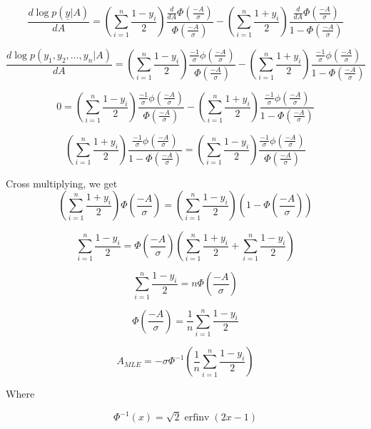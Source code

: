 \documentclass{amsart}
\DeclareMathOperator\erfinv{erfinv}
\begin{document}
\begin{equation}
\frac{d\log p(\underline{y} | A)}{dA} = \left( \sum_{i=1}^{n}\frac{1-y_i}{2} \right)  \frac{\frac{d}{dA} \Phi(\frac{-A}{\sigma})}{\Phi(\frac{-A}{\sigma})} - \left( \sum_{i=1}^{n}\frac{1+y_i}{2} \right)  \frac{\frac{d}{dA} \Phi(\frac{-A}{\sigma})}{1-\Phi(\frac{-A}{\sigma})}
\end{equation}

\begin{equation}
\frac{d\log p(y_1, y_2, ..., y_n | A)}{dA} = \left( \sum_{i=1}^{n}\frac{1-y_i}{2} \right)  \frac{\frac{-1}{\sigma} \phi(\frac{-A}{\sigma})}{\Phi(\frac{-A}{\sigma})} - \left( \sum_{i=1}^{n}\frac{1+y_i}{2} \right)  \frac{\frac{-1}{\sigma} \phi(\frac{-A}{\sigma})}{1-\Phi(\frac{-A}{\sigma})}
\end{equation}

\begin{equation}
0 = \left( \sum_{i=1}^{n}\frac{1-y_i}{2} \right)  \frac{\frac{-1}{\sigma} \phi(\frac{-A}{\sigma})}{\Phi(\frac{-A}{\sigma})} - \left( \sum_{i=1}^{n}\frac{1+y_i}{2} \right)  \frac{\frac{-1}{\sigma} \phi(\frac{-A}{\sigma})}{1-\Phi(\frac{-A}{\sigma})}
\end{equation}

\begin{equation}
\left( \sum_{i=1}^{n}\frac{1+y_i}{2} \right)  \frac{\frac{-1}{\sigma} \phi(\frac{-A}{\sigma})}{1-\Phi(\frac{-A}{\sigma})} = 
\left( \sum_{i=1}^{n}\frac{1-y_i}{2} \right)  \frac{\frac{-1}{\sigma} \phi(\frac{-A}{\sigma})}{\Phi(\frac{-A}{\sigma})} 
\end{equation}

Cross multiplying, we get
\begin{equation}
\left(\sum_{i=1}^{n}\frac{1+y_i}{2}\right)\Phi(\frac{-A}{\sigma}) = \left(\sum_{i=1}^{n}\frac{1-y_i}{2}\right)\left(1-\Phi(\frac{-A}{\sigma})\right)
\end{equation}

\begin{equation}
\sum_{i=1}^{n}\frac{1-y_i}{2} = \Phi(\frac{-A}{\sigma})\left(\sum_{i=1}^{n}\frac{1+y_i}{2} + \sum_{i=1}^{n}\frac{1-y_i}{2}\right)
\end{equation}

\begin{equation}
\sum_{i=1}^{n}\frac{1-y_i}{2} = n\Phi(\frac{-A}{\sigma})
\end{equation}

\begin{equation}
\Phi(\frac{-A}{\sigma})= \frac{1}{n}\sum_{i=1}^{n}\frac{1-y_i}{2}
\end{equation}

\begin{equation}
A_{MLE} = -\sigma\Phi^{-1}\left(\frac{1}{n}\sum_{i=1}^{n}\frac{1-y_i}{2}\right)
\end{equation}

Where

\begin{equation}
\Phi^{-1}(x) = \sqrt{2}\erfinv(2x-1)
\end{equation}
\end{document}
